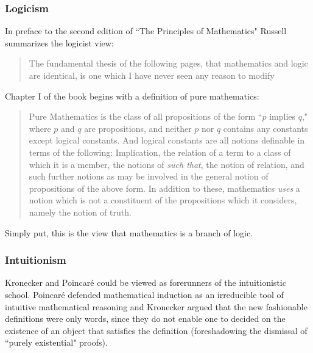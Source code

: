 \documentclass[12p]{article}
\theoremstyle{definition}
\begin{document}
\subsubsection{Logicism}
In preface to the second edition of ``The Principles of Mathematics" Russell summarizes the logicist view:
\begin{quote}
	The fundamental thesis of the following pages, that mathematics and logic are identical, is one which I have never seen any reason to modify 
\end{quote}
Chapter I of the book begins with a definition of pure mathematics:
\begin{quote}
Pure Mathematics is the class of all propositions of the form ``$p$ implies $q$," where $p$ and $q$ are propositions, and neither $p$ nor $q$ contains any constants except logical constants. And logical constants are all notions definable in terms of the following: Implication, the relation of a term to a class of which it is a member, the notions of \textit{such that}, the notion of relation, and such further notions as may be involved in the general notion of propositions of the above form. In addition to these, mathematics \textit{uses} a notion which is not a constituent of the propositions which it considers, namely the notion of truth. 
\end{quote}
Simply put, this is the view that mathematics is a branch of logic.

\subsubsection{Intuitionism}
Kronecker and Poincaré could be viewed as forerunners of the intuitionistic school. Poincaré defended mathematical induction as an irreducible tool of intuitive mathematical reasoning and Kronecker argued that the new fashionable definitions were only words, since they do not enable one to decided on the existence of an object that satisfies the definition\cite{kleene-meta} (foreshadowing the dismissal of ``purely existential" proofs). 
\end{document}
